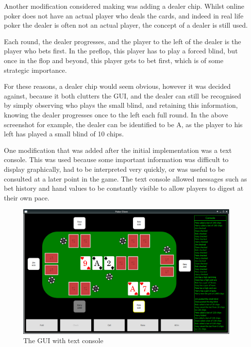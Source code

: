 Another modification considered making was adding a dealer chip. Whilst
online poker does not have an actual player who deals the cards, and indeed
in real life poker the dealer is often not an actual player, the concept of
a dealer is still used.

Each round, the dealer progresses, and the player to
the left of the dealer is the player who bets first. In the preflop, this
player has to play a forced blind, but once in the flop and beyond, this player
gets to bet first, which is of some strategic importance. 

For these reasons, a dealer chip would seem obvious, however it was decided
against, because it both clutters the GUI, and the dealer can still be
recognised by simply observing who plays the small blind, and retaining this
information, knowing the dealer progresses once to the left each full round.
In the above screenshot for example, the dealer can be identified to be A,
as the player to his left has played a small blind of 10 chips.

One modification that was added after the initial implementation was a text
console. This was used because some important information was difficult to 
display graphically, had to be interpreted very quickly, or was useful to be 
consulted at a later point in the game. The text console allowed messages such 
as bet history and hand values to be constantly visible to allow players to 
digest at their own pace.

\begin{figure}[H]
    \centering
    \includegraphics[width=\textwidth]{../images/guiwithconsole.png}
    \caption{The GUI with text console}%
    \label{fig:guiwithconsole}
\end{figure}

